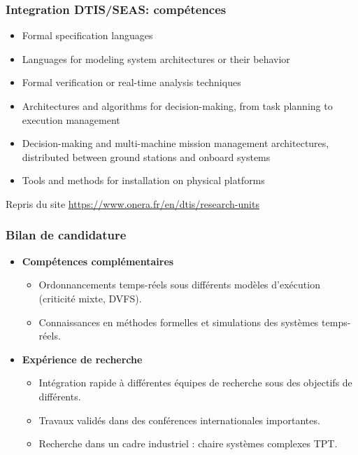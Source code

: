 \documentclass[xcolor=table]{beamer}
\begin{document}
\begin{frame}
	\frametitle{Integration DTIS/SEAS: compétences}
		
	\begin{displayquote}
		\begin{itemize}
			\item \textcolor[rgb]{0.2,0.5,0.2}{Formal specification languages}
			\item \textcolor[rgb]{0.2,0.5,0.2}{Languages for modeling system architectures or their behavior}
			\item \textcolor[rgb]{0.2,0.5,0.2}{Formal verification} or \textcolor[rgb]{0.2,0.5,0.2}{real-time 
			analysis techniques}
			\item Architectures and algorithms for decision-making, from task planning to execution management
			\item Decision-making and multi-machine mission management architectures, distributed between 
			ground stations and onboard systems
			\item \textcolor[rgb]{0.2,0.5,0.2}{Tools and methods for installation on physical platforms}
		\end{itemize}
	\end{displayquote}

	Repris du site \url{https://www.onera.fr/en/dtis/research-units}
	
\end{frame}

\begin{frame}
	\frametitle{Bilan de candidature}
	
	\begin{itemize}
		\item \textbf{Compétences complémentaires}
		\begin{itemize}
			\item Ordonnancements temps-réels sous différents modèles d'exécution (criticité mixte, 
			DVFS).
			\item Connaissances en méthodes formelles et simulations des systèmes temps-réels.
		\end{itemize}
		\item \textbf{Expérience de recherche}
		\begin{itemize}
			\item Intégration rapide à différentes équipes de recherche sous des objectifs de différents.
			\item Travaux validés dans des conférences internationales importantes.
			\item Recherche dans un cadre industriel : chaire systèmes complexes TPT.
		\end{itemize}
	\end{itemize}
\end{frame}
\end{document}

